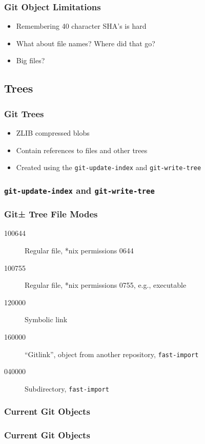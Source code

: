 \documentclass{beamer}
\begin{document}
\begin{frame}
\frametitle{Git Object Limitations}
\begin{itemize}
\item{Remembering 40 character SHA's is hard}
\item{What about file names? Where did that go?}
\item{Big files?}
\end{itemize}
\end{frame}

\subsection{Trees}

\begin{frame}
\frametitle{Git Trees}
\begin{itemize}
\item{ZLIB compressed blobs}
\item{Contain references to files and other trees}
\item{Created using the \texttt{git-update-index} and \texttt{git-write-tree}}
\end{itemize}
\end{frame}

\begin{frame}[fragile]
\frametitle{\texttt{git-update-index} and \texttt{git-write-tree}}

\end{frame}

\begin{frame}
\frametitle{Git± Tree File Modes}
\begin{description}
\item[100644]{Regular file, *nix permissions 0644}
\item[100755]{Regular file, *nix permissions 0755, e.g., executable}
\item[120000]{Symbolic link}
\item[160000]{``Gitlink'', object from another repository, \texttt{fast-import}}
\item[040000]{Subdirectory, \texttt{fast-import}}
\end{description}
\end{frame}

\begin{frame}[fragile]
\frametitle{Current Git Objects}

\end{frame}

\begin{frame}
\frametitle{Current Git Objects}
\begin{figure}
\end{figure}
\end{frame}
\end{document}
